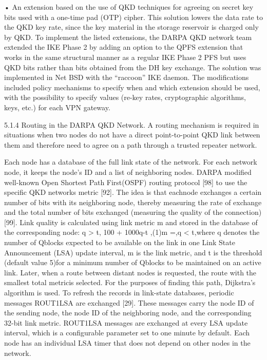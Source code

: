 • An extension based on the use of QKD techniques for agreeing on secret key bits used with a one-time pad (OTP) cipher. This solution lowers the data rate to the QKD key rate, since the key material in the storage reservoir is charged only by QKD.
To implement the listed extensions, the DARPA QKD network team extended the IKE Phase 2 by adding an option to the QPFS extension that works in the same structural manner as a regular IKE Phase 2 PFS but uses QKD bits rather than bits obtained from the DH key exchange. The solution was implemented in Net BSD with the “raccoon” IKE daemon. The modifications included policy mechanisms to specify when and which extension should be used, with the possibility to specify values (re-key rates, cryptographic algorithms, keys, etc.) for each VPN gateway.

5.1.4 Routing in the DARPA QKD Network. A routing mechanism is required in situations when two nodes do not have a direct point-to-point QKD link between them and therefore need to agree on a path through a trusted repeater network.

Each node has a database of the full link state of the network. For each network node, it keeps the node’s ID and a list of neighboring nodes. DARPA modified well-known Open Shortest Path First(OSPF) routing protocol [98] to use the specific QKD networks metric [92]. The idea is that eachnode exchanges a certain number of bits with its neighboring node, thereby measuring the rate of exchange and the total number of bits exchanged (measuring the quality of the connection) [99].
Link quality is calculated using link metric m and stored in the database of the corresponding node: q > t, 100 + 1000q-t ,(1)m =,q < t,where q denotes the number of Qblocks expected to be available on the link in one Link State Announcement (LSA) update interval, m is the link metric, and t is the threshold (default value 5)for a minimum number of Qblocks to be maintained on an active link.
Later, when a route between distant nodes is requested, the route with the smallest total metricis selected. For the purposes of finding this path, Dijkstra’s algorithm is used. To refresh the records in link-state databases, periodic messages ROUT1LSA are exchanged [29]. These messages carry the node ID of the sending node, the node ID of the neighboring node, and the corresponding 32-bit link metric. ROUT1LSA messages are exchanged at every LSA update interval, which is a configurable parameter set to one minute by default. Each node has an individual LSA timer that does not depend on other nodes in the network.

